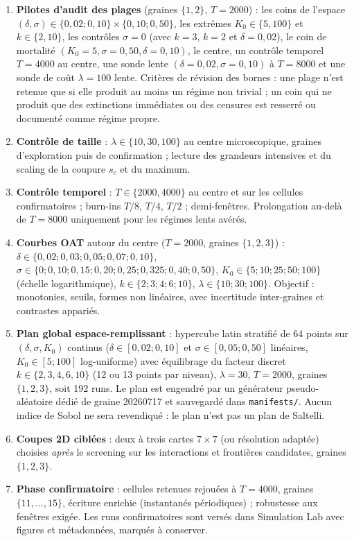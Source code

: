 \documentclass[11pt,a4paper]{article}
\newcommand{\code}[1]{\texttt{#1}}
\begin{document}
\begin{enumerate}
\item \textbf{Pilotes d'audit des plages} (graines $\{1,2\}$, $T=2000$) :
  les coins de l'espace $(\delta,\sigma)\in\{0{,}02;0{,}10\}\times
  \{0{,}10;0{,}50\}$, les extrêmes $K_0\in\{5,100\}$ et $k\in\{2,10\}$, les
  contrôles $\sigma=0$ (avec $k=3$, $k=2$ et $\delta=0{,}02$), le coin de
  mortalité $(K_0{=}5,\sigma{=}0{,}50,\delta{=}0{,}10)$, le centre, un
  contrôle temporel $T=4000$ au centre, une sonde lente
  $(\delta{=}0{,}02,\sigma{=}0{,}10)$ à $T=8000$ et une sonde de coût
  $\lambda=100$ lente. Critères de révision des bornes : une plage n'est
  retenue que si elle produit au moins un régime non trivial ; un coin qui
  ne produit que des extinctions immédiates ou des censures est resserré ou
  documenté comme régime propre.
\item \textbf{Contrôle de taille} : $\lambda\in\{10,30,100\}$ au centre
  microscopique, graines d'exploration puis de confirmation ; lecture des
  grandeurs intensives et du scaling de la coupure $s_c$ et du maximum.
\item \textbf{Contrôle temporel} : $T\in\{2000,4000\}$ au centre et sur
  les cellules confirmatoires ; burn-ins $T/8$, $T/4$, $T/2$ ;
  demi-fenêtres. Prolongation au-delà de $T=8000$ uniquement pour les
  régimes lents avérés.
\item \textbf{Courbes OAT} autour du centre ($T=2000$, graines
  $\{1,2,3\}$) :
  $\delta\in\{0{,}02;0{,}03;0{,}05;0{,}07;0{,}10\}$,
  $\sigma\in\{0;0{,}10;0{,}15;0{,}20;0{,}25;0{,}325;0{,}40;0{,}50\}$,
  $K_0\in\{5;10;25;50;100\}$ (échelle logarithmique),
  $k\in\{2;3;4;6;10\}$, $\lambda\in\{10;30;100\}$. Objectif : monotonies,
  seuils, formes non linéaires, avec incertitude inter-graines et
  contrastes appariés.
\item \textbf{Plan global espace-remplissant} : hypercube latin stratifié
  de 64 points sur $(\delta,\sigma,K_0)$ continus
  ($\delta\in[0{,}02;0{,}10]$ et $\sigma\in[0{,}05;0{,}50]$ linéaires,
  $K_0\in[5;100]$ log-uniforme) avec équilibrage du facteur discret
  $k\in\{2,3,4,6,10\}$ (12 ou 13 points par niveau), $\lambda=30$,
  $T=2000$, graines $\{1,2,3\}$, soit 192 runs. Le plan est engendré par un
  générateur pseudo-aléatoire dédié de graine 20260717 et sauvegardé dans
  \code{manifests/}. Aucun indice de Sobol ne sera revendiqué : le plan
  n'est pas un plan de Saltelli.
\item \textbf{Coupes 2D ciblées} : deux à trois cartes $7\times7$ (ou
  résolution adaptée) choisies \emph{après} le screening sur les
  interactions et frontières candidates, graines $\{1,2,3\}$.
\item \textbf{Phase confirmatoire} : cellules retenues rejouées à
  $T=4000$, graines $\{11,\dots,15\}$, écriture enrichie (instantanés
  périodiques) ; robustesse aux fenêtres exigée. Les runs confirmatoires
  sont versés dans Simulation Lab avec figures et métadonnées, marqués à
  conserver.
\end{enumerate}
\end{document}
